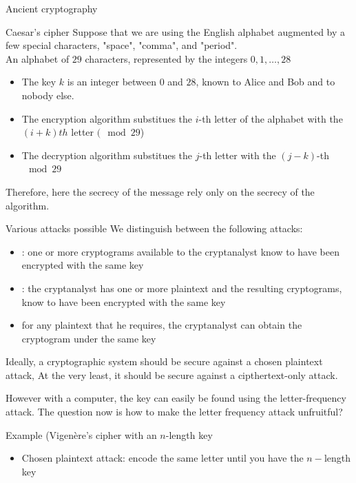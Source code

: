 \begin{parag}{Ancient cryptography}
    \begin{subparag}{Caesar's cipher}
        Suppose that we are using the English alphabet augmented by a few special characters, "space", "comma", and "period".\\ An alphabet of $29$ characters, represented by the integers $0, 1 , \dots, 28$
        \begin{itemize}
            \item The key $k$ is an integer between $0$ and $28$, known to Alice and Bob and to nobody else.
        \item The encryption algorithm substitues the $i$-th letter of the alphabet with the $(i + k)th$ letter $(\mod 29$)
        \item The decryption algorithm substitues the $j$-th letter with the $(j-k)$-th $\mod 29$ 
    \end{itemize}
       Therefore, here the secrecy of the message rely only on the secrecy of the algorithm. 
    \end{subparag}
    \begin{subparag}{Various attacks possible}
        We distinguish between the following attacks:
        \begin{itemize}
            \item {}: one or more cryptograms available to the cryptanalyst know to have been encrypted with the same key
            \item {}: the cryptanalyst has one or more plaintext and the resulting cryptograms, know to have been encrypted with the same key
            \item {} for any plaintext that he requires, the cryptanalyst can obtain the cryptogram under the same key
        \end{itemize}
        Ideally, a cryptographic system should be secure against a chosen plaintext attack, At the very least, it should be secure against a cipthertext-only attack.
    \end{subparag}
    However with a computer, the key can easily be found using the letter-frequency attack. The question now is how to make the letter frequency attack unfruitful?
\begin{subparag}{Example (Vigenère's cipher with an $n$-length key}
    \begin{itemize}
        \item Chosen plaintext attack: encode the same letter until you have the $n-$length key

\end{itemize}
\end{subparag}
\end{parag}
